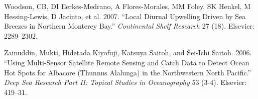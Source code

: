 \documentclass[12pt,A4paper,]{article}
\begin{document}
\hypertarget{ref-Woodson2007}{}
Woodson, CB, DI Eerkes-Medrano, A Flores-Morales, MM Foley, SK Henkel, M
Hessing-Lewis, D Jacinto, et al. 2007. ``Local Diurnal Upwelling Driven
by Sea Breezes in Northern Monterey Bay.'' \emph{Continental Shelf
Research} 27 (18). Elsevier: 2289--2302.

\hypertarget{ref-Zainuddin2006}{}
Zainuddin, Mukti, Hidetada Kiyofuji, Katsuya Saitoh, and Sei-Ichi
Saitoh. 2006. ``Using Multi-Sensor Satellite Remote Sensing and Catch
Data to Detect Ocean Hot Spots for Albacore (Thunnus Alalunga) in the
Northwestern North Pacific.'' \emph{Deep Sea Research Part II: Topical
Studies in Oceanography} 53 (3-4). Elsevier: 419--31.
\end{document}
